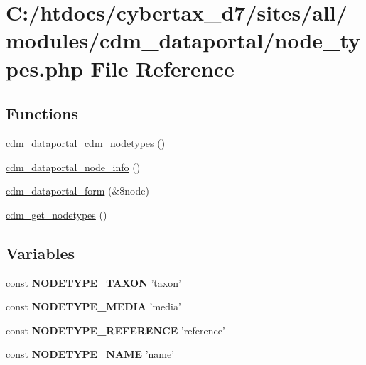 \hypertarget{node__types_8php}{\section{C\-:/htdocs/cybertax\-\_\-d7/sites/all/modules/cdm\-\_\-dataportal/node\-\_\-types.php File Reference}
\label{node__types_8php}
}
\subsection*{Functions}
\begin{DoxyCompactItemize}
\item 
\hyperlink{node__types_8php_ab616cec1f7d67410afa0ebe01c5a2c6d}{cdm\-\_\-dataportal\-\_\-cdm\-\_\-nodetypes} ()
\item 
\hyperlink{node__types_8php_a55f554b6fe52ba0c58f7fc9438bafab7}{cdm\-\_\-dataportal\-\_\-node\-\_\-info} ()
\item 
\hyperlink{node__types_8php_a854d816e27a49907978bd67d7c0fe3f0}{cdm\-\_\-dataportal\-\_\-form} (\&\$node)
\item 
\hyperlink{node__types_8php_a9f0523dbc6fd02275a8977ab0cadf625}{cdm\-\_\-get\-\_\-nodetypes} ()
\end{DoxyCompactItemize}
\subsection*{Variables}
\begin{DoxyCompactItemize}
\item 
\hypertarget{node__types_8php_aede1497f1a1fb174f00b789208f1a76b}{const {\bfseries N\-O\-D\-E\-T\-Y\-P\-E\-\_\-\-T\-A\-X\-O\-N} 'taxon'}\label{node__types_8php_aede1497f1a1fb174f00b789208f1a76b}

\item 
\hypertarget{node__types_8php_a0f36b78873191dc2073ee3ffc933cafd}{const {\bfseries N\-O\-D\-E\-T\-Y\-P\-E\-\_\-\-M\-E\-D\-I\-A} 'media'}\label{node__types_8php_a0f36b78873191dc2073ee3ffc933cafd}

\item 
\hypertarget{node__types_8php_a9fa348add5d02aee5a17ef45f2aea70d}{const {\bfseries N\-O\-D\-E\-T\-Y\-P\-E\-\_\-\-R\-E\-F\-E\-R\-E\-N\-C\-E} 'reference'}\label{node__types_8php_a9fa348add5d02aee5a17ef45f2aea70d}

\item 
\hypertarget{node__types_8php_ac12a45c24b79996aa1cda823e1a50b13}{const {\bfseries N\-O\-D\-E\-T\-Y\-P\-E\-\_\-\-N\-A\-M\-E} 'name'}\label{node__types_8php_ac12a45c24b79996aa1cda823e1a50b13}

\end{DoxyCompactItemize}


